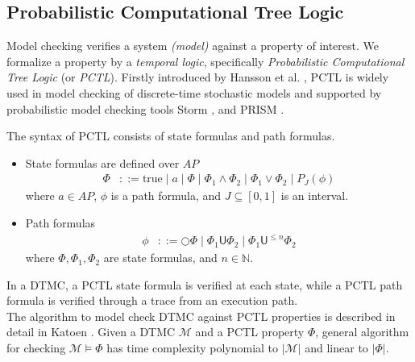\subsection{Probabilistic Computational Tree Logic}
Model checking verifies a system \textit{(model)} against a property of interest. We
formalize a property by a \textit{temporal logic}, specifically \textit{Probabilistic Computational
      Tree Logic} (or \textit{PCTL}). Firstly introduced by Hansson et al. \cite{hansson1994logic}, PCTL
is widely used in model checking of discrete-time stochastic models and supported by
probabilistic model checking tools Storm \cite{dehnert2017storm}, and PRISM \cite{kwiatkowska2011prism}.
\begin{definition}
      \rm
      The syntax of PCTL consists of state formulas and path formulas.
      \begin{itemize}
            \item State formulas are defined over $AP$
                  \begin{align*}
                        \Phi & ::= \text{true} \;|\; a \;|\; \Phi \;|\; \Phi_1 \wedge \Phi_2 \;|\; \Phi_1 \vee \Phi_2 \;|\;  P_{J}(\phi)
                  \end{align*}
                  where $a\in AP$, $\phi$ is a path formula, and $J\subseteq[0,1]$ is an interval.
            \item Path formulas
                  \begin{align*}
                        \phi & ::= \bigcirc \Phi \;|\; \Phi_1 \mathsf{U} \Phi_2 \;|\; \Phi_1 \mathsf{U}^{\leq n} \Phi_2
                  \end{align*}
                  where $\Phi,\Phi_1,\Phi_2$ are state formulas, and $n\in \mathbb{N}$.
      \end{itemize}
\end{definition}
\noindent  In a DTMC, a PCTL state formula is verified at each state, while a PCTL path formula is
verified through a trace from an execution path.\\
The algorithm to model check DTMC against PCTL properties is described in detail in Katoen
\cite{baier2008principles}. Given a DTMC $\mathcal{M}$ and a PCTL property $\Phi$, general algorithm
for checking $\mathcal{M}\models\Phi$ has time complexity polynomial to $|\mathcal{M}|$ and linear
to $|\Phi|$.
